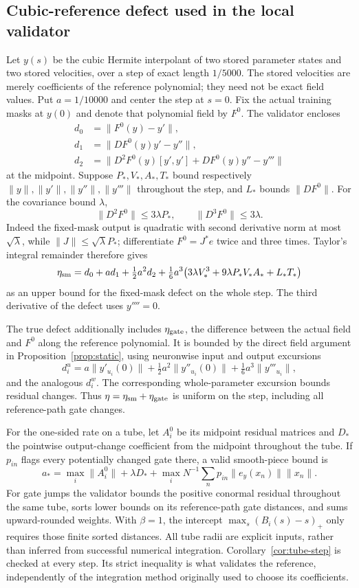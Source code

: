 \documentclass[10pt]{article}
\begin{document}
\subsection{Cubic-reference defect used in the local validator}
Let $y(s)$ be the cubic Hermite interpolant of two stored parameter states
and two stored velocities, over a step of exact length $1/5000$.
The stored velocities are merely coefficients of the reference polynomial;
they need not be exact field values. Put $a=1/10000$ and center the step
at $s=0$. Fix the actual training masks at $y(0)$ and denote that polynomial
field by $F^0$. The validator encloses
\begin{align*}
 d_0&=\|F^0(y)-y'\|,\\
 d_1&=\|DF^0(y)y'-y''\|,\\
 d_2&=\|D^2F^0(y)[y',y']+DF^0(y)y''-y'''\|
\end{align*}
at the midpoint. Suppose $P_*,V_*,A_*,T_*$ bound respectively
$\|y\|,\|y'\|,\|y''\|,\|y'''\|$ throughout the step, and $L_*$
bounds $\|DF^0\|$. For the covariance bound $\lambda$,
\[
 \|D^2F^0\|\le3\lambda P_*,\qquad
 \|D^3F^0\|\le3\lambda.
\]
Indeed the fixed-mask output is quadratic with second derivative norm
at most $\sqrt\lambda$, while $\|J\|\le\sqrt\lambda P_*$;
differentiate $F^0=J^*e$ twice and three times.
Taylor's integral remainder therefore gives
\[
 \eta_{\rm sm}=d_0+ad_1+\tfrac12a^2d_2+
 \tfrac16a^3\big(3\lambda V_*^3+9\lambda P_*V_*A_*+L_*T_*\big)
\]
as an upper bound for the fixed-mask defect on the whole step.
The third derivative of the defect uses $y''''=0$.

The true defect additionally includes $\eta_{\rm gate}$, the difference
between the actual field and $F^0$ along the reference polynomial.
It is bounded by the direct field argument in
Proposition~\ref{prop:static}, using neuronwise input and output excursions
\[
 d_i^u=a\|y'_{u_i}(0)\|+\tfrac12a^2\|y''_{u_i}(0)\|
                    +\tfrac16a^3\|y'''_{u_i}\|,
\]
and the analogous $d_i^w$. The corresponding whole-parameter excursion
bounds residual changes. Thus $\eta=\eta_{\rm sm}+\eta_{\rm gate}$ is
uniform on the step, including all reference-path gate changes.

For the one-sided rate on a tube, let $A_i^0$ be its midpoint residual
matrices and $D_*$ the pointwise output-change coefficient from the midpoint
throughout the tube. If $p_{in}$ flags every potentially changed gate there,
a valid smooth-piece bound is
\[
 a_* = \max_i\|A_i^0\|+\lambda D_*
       +\max_i N^{-1}\sum_n p_{in}\|e_y(x_n)\|\|x_n\|.
\]
For gate jumps the validator bounds the positive conormal residual throughout
the same tube, sorts lower bounds on its reference-path gate distances,
and sums upward-rounded weights. With $\beta=1$, the intercept
$\max_s(B_i(s)-s)_+$ only requires those finite sorted distances.
All tube radii are explicit inputs, rather than inferred from successful
numerical integration. Corollary~\ref{cor:tube-step} is checked at every
step. Its strict inequality is what validates the reference, independently
of the integration method originally used to choose its coefficients.
\end{document}
